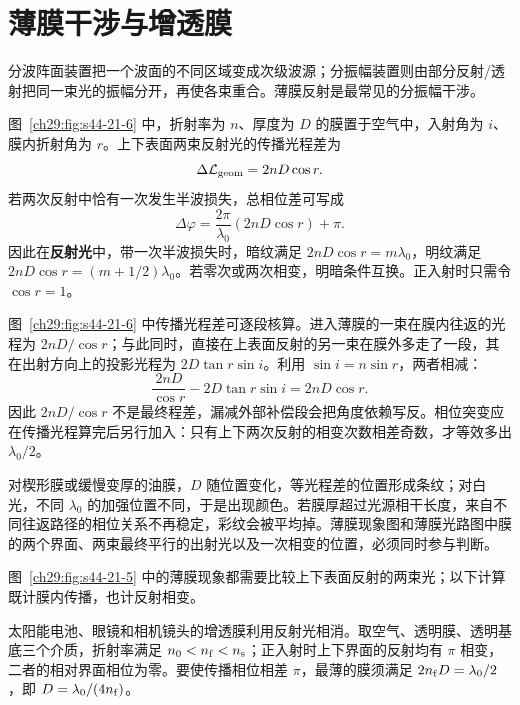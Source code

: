 \section{薄膜干涉与增透膜}



分波阵面装置把一个波面的不同区域变成次级波源；分振幅装置则由部分反射/透射把同一束光的振幅分开，再使各束重合。薄膜反射是最常见的分振幅干涉。

图~\ref{ch29:fig:s44-21-6} 中，折射率为 $n$、厚度为 $D$ 的膜置于空气中，入射角为 $i$、膜内折射角为 $r$。上下表面两束反射光的传播光程差为
\[
 \Delta\mathcal L_{\rm geom}=2nD\cos r.
\]
若两次反射中恰有一次发生半波损失，总相位差可写成
\begin{equation}
 \Delta\varphi=\frac{2\pi}{\lambda_0}(2nD\cos r)+\pi.
\end{equation}
因此在\textbf{反射光}中，带一次半波损失时，暗纹满足 $2nD\cos r=m\lambda_0$，明纹满足 $2nD\cos r=(m+1/2)\lambda_0$。若零次或两次相变，明暗条件互换。正入射时只需令 $\cos r=1$。

图~\ref{ch29:fig:s44-21-6} 中传播光程差可逐段核算。进入薄膜的一束在膜内往返的光程为 $2nD/\cos r$；与此同时，直接在上表面反射的另一束在膜外多走了一段，其在出射方向上的投影光程为 $2D\tan r\sin i$。利用 $\sin i=n\sin r$，两者相减：
\[
 \frac{2nD}{\cos r}-2D\tan r\sin i
 =2nD\cos r.
\]
因此 $2nD/\cos r$ 不是最终程差，漏减外部补偿段会把角度依赖写反。相位突变应在传播光程算完后另行加入：只有上下两次反射的相变次数相差奇数，才等效多出 $\lambda_0/2$。

对楔形膜或缓慢变厚的油膜，$D$ 随位置变化，等光程差的位置形成条纹；对白光，不同 $\lambda_0$ 的加强位置不同，于是出现颜色。若膜厚超过光源相干长度，来自不同往返路径的相位关系不再稳定，彩纹会被平均掉。薄膜现象图和薄膜光路图中膜的两个界面、两束最终平行的出射光以及一次相变的位置，必须同时参与判断。

\FilmPhenomenaPanel
图~\ref{ch29:fig:s44-21-5} 中的薄膜现象都需要比较上下表面反射的两束光；以下计算既计膜内传播，也计反射相变。
\ThinFilmDiagram

太阳能电池、眼镜和相机镜头的增透膜利用反射光相消。取空气、透明膜、透明基底三个介质，折射率满足 $n_0<n_{\rm f}<n_{\rm s}$；正入射时上下界面的反射均有 $\pi$ 相变，二者的相对界面相位为零。要使传播相位相差 $\pi$，最薄的膜须满足 $2n_{\rm f}D=\lambda_0/2$，即 $D=\lambda_0/(4n_{\rm f})$。

